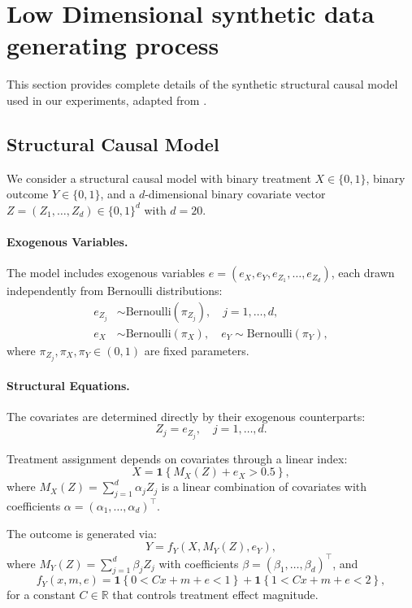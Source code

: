 \documentclass[accepted]{uai2026} %
\theoremstyle{plain}
\theoremstyle{definition}
\theoremstyle{remark}
\begin{document}
\section{Low Dimensional synthetic data generating process}
\label{app:dgp-low-dim}

This section provides complete details of the synthetic structural causal model used in our experiments, adapted from \citet{li2022probabilities}.

\subsection{Structural Causal Model}
\label{app:dgp:scm}

We consider a structural causal model with binary treatment $X \in \{0,1\}$, binary outcome $Y \in \{0,1\}$, and a $d$-dimensional binary covariate vector $Z = (Z_1, \ldots, Z_d) \in \{0,1\}^d$ with $d = 20$.

\paragraph{Exogenous Variables.}
The model includes exogenous variables $e = (e_X, e_Y, e_{Z_1}, \ldots, e_{Z_d})$, each drawn independently from Bernoulli distributions:
\begin{align}
e_{Z_j} &\sim \text{Bernoulli}(\pi_{Z_j}), \quad j = 1, \ldots, d, \\
e_X &\sim \text{Bernoulli}(\pi_X), \quad e_Y \sim \text{Bernoulli}(\pi_Y),
\end{align}
where $\pi_{Z_j}, \pi_X, \pi_Y \in (0,1)$ are fixed parameters.

\paragraph{Structural Equations.}
The covariates are determined directly by their exogenous counterparts:
\begin{equation}
Z_j = e_{Z_j}, \quad j = 1, \ldots, d.
\end{equation}

Treatment assignment depends on covariates through a linear index:
\begin{equation}
X = \mathbf{1}\left\{ M_X(Z) + e_X > 0.5 \right\},
\end{equation}
where $M_X(Z) = \sum_{j=1}^{d} \alpha_j Z_j$ is a linear combination of covariates with coefficients $\alpha = (\alpha_1, \ldots, \alpha_d)^\top$.

The outcome is generated via:
\begin{equation}
Y = f_Y(X, M_Y(Z), e_Y),
\end{equation}
where $M_Y(Z) = \sum_{j=1}^{d} \beta_j Z_j$ with coefficients $\beta = (\beta_1, \ldots, \beta_d)^\top$, and
\begin{equation}
f_Y(x, m, e) = \mathbf{1}\left\{ 0 < Cx + m + e < 1 \right\} + \mathbf{1}\left\{ 1 < Cx + m + e < 2 \right\},
\end{equation}
for a constant $C \in \mathbb{R}$ that controls treatment effect magnitude.
\end{document}
